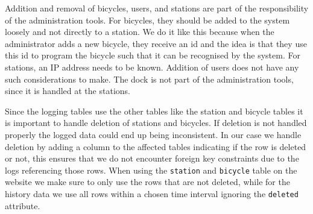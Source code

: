Addition and removal of bicycles, users, and stations are part of the responsibility of the administration tools. 
For bicycles, they should be added to the system loosely and not directly to a station.
We do it like this because when the administrator adds a new bicycle, they receive an id and the idea is that they use this id to program the bicycle such that it can be recognised by the system.
For stations, an IP address needs to be known.
Addition of users does not have any such considerations to make. 
The dock is not part of the administration tools, since it is handled at the stations.

Since the logging tables use the other tables like the station and bicycle tables it is important to handle deletion of stations and bicycles. 
If deletion is not handled properly the logged data could end up being inconsistent. 
In our case we handle deletion by adding a column to the affected tables indicating if the row is deleted or not, this ensures that we do not encounter foreign key constraints due to the logs referencing those rows. 
When using the \texttt{station} and \texttt{bicycle} table on the website we make sure to only use the rows that are not deleted, while for the history data we use all rows within a chosen time interval ignoring the \texttt{deleted} attribute.

